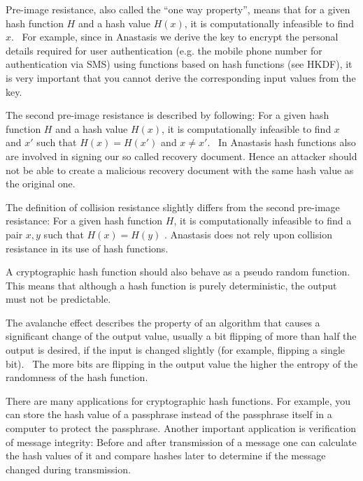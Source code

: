 Pre-image resistance, also called the ``one way property'', means that
for a given hash function $H$ and a hash value $H(x)$, it is
computationally infeasible to find $x$.~\cite{SG2012} For example,
since in Anastasis we derive the key to encrypt the personal details
required for user authentication (e.g. the mobile phone number for
authentication via SMS) using functions based on hash functions (see
HKDF), it is very important that you cannot derive the corresponding
input values from the key.

The second pre-image resistance is described by following: For a given
hash function $H$ and a hash value $H(x)$, it is computationally
infeasible to find $x$ and $x'$ such that $H(x) = H(x')$ and $x \not=
x'$.~\cite{SG2012} In Anastasis hash functions also are involved in
signing our so called recovery document. Hence an attacker should not
be able to create a malicious recovery document with the same hash
value as the original one.

The definition of collision resistance slightly differs from the
second pre-image resistance: For a given hash function $H$, it is
computationally infeasible to find a pair $x, y$ such that $H(x) =
H(y)$ \cite{SG2012}.
Anastasis does not rely upon collision resistance in its use of hash
functions. %

A cryptographic hash function should also behave as a pseudo random
function. This means that although a hash function is purely
deterministic, the output must not be predictable.

The avalanche effect describes the property of an algorithm that
causes a significant change of the output value, usually a bit
flipping of more than half the output is desired, if the input is
changed slightly (for example, flipping a single bit).~\cite{RK2011}
The more bits are flipping in the output value the higher the entropy
of the randomness of the hash function.

There are many applications for cryptographic hash functions. For
example, you can store the hash value of a passphrase instead of the
passphrase itself in a computer to protect the passphrase. Another
important application is verification of message integrity: Before and
after transmission of a message one can calculate the hash values of
it and compare hashes later to determine if the message changed during
transmission.

